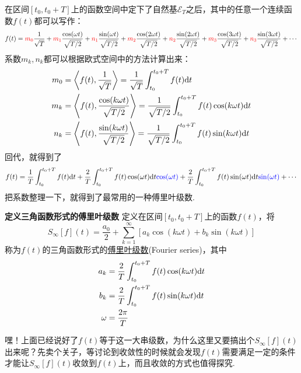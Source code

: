 \documentclass[UTF8]{ctexart}
\newcommand{\trm}[1]{{\rm #1}}
\newenvironment{definition}[1]
    {\begin{tcolorbox}[enhanced, colback=LightYellow, breakable=false, frame hidden, borderline west={1.5mm}{-2mm}{DarkGreen}]
    {\bfseries {\color{DarkGreen} 定义}\quad #1} \newline}
    {\end{tcolorbox}}
\begin{document}
在区间\([t_0,t_0+T]\)上的函数空间中定下了自然基\(\mathcal{E}_{T}\)之后，其中的任意一个连续函数\(f(t)\)都可以写作：
\[ f(t) = {\color{red}m_0}\frac{1}{\sqrt{T}} + {\color{red}m_1}\frac{\cos(\omega t)}{\sqrt{T/2}} + {\color{red}n_1}\frac{\sin(\omega t)}{\sqrt{T/2}} + {\color{red}m_2}\frac{\cos(2\omega t)}{\sqrt{T/2}} + {\color{red}n_2}\frac{\sin(2\omega t)}{\sqrt{T/2}} + {\color{red}m_3}\frac{\cos(3\omega t)}{\sqrt{T/2}} + {\color{red}n_3}\frac{\sin(3\omega t)}{\sqrt{T/2}} + \cdots\]
系数\(m_k,n_k\)都可以根据欧式空间中的方法计算出来：
\begin{align*}
    m_0 &= \left\langle f(t), \frac{1}{\sqrt{T}} \right\rangle = \frac{1}{\sqrt{T}}\int_{t_0}^{t_0+T} f(t)\trm{d}t \\
    m_k &= \left\langle f(t), \frac{\cos(k\omega t)}{\sqrt{T/2}} \right\rangle = \frac{1}{\sqrt{T/2}}\int_{t_0}^{t_0+T} f(t)\cos(k\omega t)\trm{d}t \\
    n_k &= \left\langle f(t), \frac{\sin(k\omega t)}{\sqrt{T/2}} \right\rangle = \frac{1}{\sqrt{T/2}}\int_{t_0}^{t_0+T} f(t)\sin(k\omega t)\trm{d}t
\end{align*}
回代，就得到了
\[ f(t) = \frac{1}{T} \int_{t_0}^{t_0+T} f(t)\trm{d}t + \frac{2}{T}\int_{t_0}^{t_0+T} f(t)\cos(\omega t)\trm{d}t{\color{blue}\cos(\omega t)} + \frac{2}{T}\int_{t_0}^{t_0+T} f(t)\sin(\omega t)\trm{d}t{\color{blue}\sin(\omega t)}+\cdots\]
把系数整理一下，就得到了最常用的一种傅里叶级数.
\begin{definition}{三角函数形式的傅里叶级数}
    定义在区间\([t_0,t_0+T]\)上的函数\(f(t)\)，将
    \[S_{\infty}[f](t) = \frac{a_0}{2}+\sum_{k=1}^{\infty} \left[a_k\cos(k\omega t)+b_k\sin(k\omega t)\right]\]
    称为\(f(t)\)的三角函数形式的\uline{傅里叶级数}(Fourier series)，其中
    \begin{align*}
        a_k &= \frac{2}{T}\int_{t_0}^{t_0+T} f(t)\cos(k\omega t)\trm{d}t \\
        b_k &= \frac{2}{T}\int_{t_0}^{t_0+T} f(t)\sin(k\omega t)\trm{d}t \\
        \omega &= \frac{2\pi}{T}
    \end{align*}
\end{definition}

嘿！上面已经说好了\(f(t)\)等于这一大串级数，为什么这里又要搞出个\(S_{\infty}[f](t)\)出来呢？先卖个关子，等讨论到收敛性的时候就会发现\(f(t)\)需要满足一定的条件才能让\(S_{\infty}[f](t)\)收敛到\(f(t)\)上，而且收敛的方式也值得探究.

\vspace{1cm}
\end{document}

